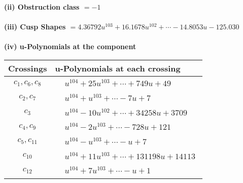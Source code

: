 \documentclass[1p]{elsarticle_modified}
\theoremstyle{definition}
\begin{document}
\flushleft \textbf{(ii) Obstruction class $= -1$}\\~\\
\flushleft \textbf{(iii) Cusp Shapes $= 4.36792 u^{103}+16.1678 u^{102}+\cdots-14.8053 u-125.030$}\\~\\
\newpage\renewcommand{\arraystretch}{1}
\flushleft \textbf{(iv) u-Polynomials at the component}\newline \\
\begin{tabular}{m{50pt}|m{274pt}}
Crossings & \hspace{64pt}u-Polynomials at each crossing \\
\hline $$\begin{aligned}c_{1},c_{6},c_{8}\end{aligned}$$&$\begin{aligned}
&u^{104}+25 u^{103}+\cdots+749 u+49
\end{aligned}$\\
\hline $$\begin{aligned}c_{2},c_{7}\end{aligned}$$&$\begin{aligned}
&u^{104}+u^{103}+\cdots-7 u+7
\end{aligned}$\\
\hline $$\begin{aligned}c_{3}\end{aligned}$$&$\begin{aligned}
&u^{104}-10 u^{102}+\cdots+34258 u+3709
\end{aligned}$\\
\hline $$\begin{aligned}c_{4},c_{9}\end{aligned}$$&$\begin{aligned}
&u^{104}-2 u^{103}+\cdots-728 u+121
\end{aligned}$\\
\hline $$\begin{aligned}c_{5},c_{11}\end{aligned}$$&$\begin{aligned}
&u^{104}- u^{103}+\cdots- u+7
\end{aligned}$\\
\hline $$\begin{aligned}c_{10}\end{aligned}$$&$\begin{aligned}
&u^{104}+11 u^{103}+\cdots+131198 u+14113
\end{aligned}$\\
\hline $$\begin{aligned}c_{12}\end{aligned}$$&$\begin{aligned}
&u^{104}+7 u^{103}+\cdots- u+1
\end{aligned}$\\
\hline
\end{tabular}\\~\\
\end{document}
